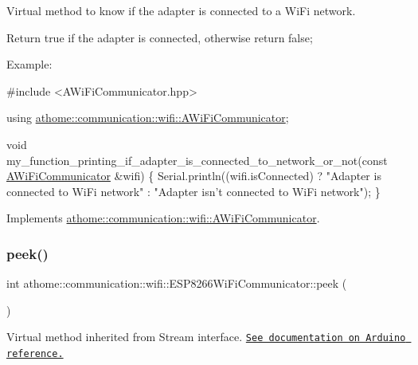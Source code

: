 Virtual method to know if the adapter is connected to a Wi\+Fi network.

Return true if the adapter is connected, otherwise return false;

Example\+:


\begin{DoxyCode}
\textcolor{preprocessor}{#include <AWiFiCommunicator.hpp>}

\textcolor{keyword}{using} \mbox{\hyperlink{classathome_1_1communication_1_1wifi_1_1_a_wi_fi_communicator}{athome::communication::wifi::AWiFiCommunicator}};

\textcolor{keywordtype}{void} my\_function\_printing\_if\_adapter\_is\_connected\_to\_network\_or\_not(\textcolor{keyword}{const} 
      \mbox{\hyperlink{classathome_1_1communication_1_1wifi_1_1_a_wi_fi_communicator_a0098148fe8d0eeee99b7f8f72a72a900}{AWiFiCommunicator}} &wifi) \{
  Serial.println((wifi.isConnected) ? \textcolor{stringliteral}{"Adapter is connected to WiFi network"} : \textcolor{stringliteral}{"Adapter isn't connected to
       WiFi network"});
\}
\end{DoxyCode}
 

Implements \mbox{\hyperlink{classathome_1_1communication_1_1wifi_1_1_a_wi_fi_communicator_a578087d01c814481d89ea702a6d7ed01}{athome\+::communication\+::wifi\+::\+A\+Wi\+Fi\+Communicator}}.

\mbox{\label{classathome_1_1communication_1_1wifi_1_1_e_s_p8266_wi_fi_communicator_affeb5491ad5c97fa53a683926f8184d2}} 
\subsubsection{\texorpdfstring{peek()}{peek()}}
{\footnotesize\ttfamily int athome\+::communication\+::wifi\+::\+E\+S\+P8266\+Wi\+Fi\+Communicator\+::peek (\begin{DoxyParamCaption}{ }\end{DoxyParamCaption})\hspace{0.3cm}{\ttfamily [virtual]}}

Virtual method inherited from Stream interface. \href{https://www.arduino.cc/reference/en/language/functions/communication/stream/streampeek/}{\tt See documentation on Arduino reference.} 

